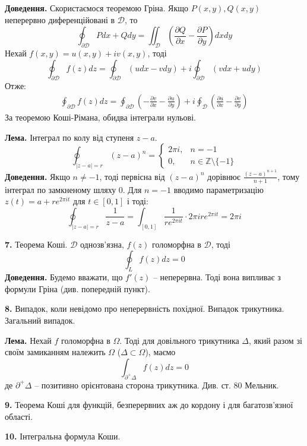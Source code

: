 \documentclass[14pt]{extarticle}
\begin{document}
\textbf{Доведення.} Скористаємося теоремою Гріна. Якщо $P(x,y),Q(x,y)$ неперервно диференційовані в $\mathcal{D}$, то
\[
\oint_{\partial\mathcal{D}}Pdx+Qdy = \iint_{\mathcal{D}}\left(\frac{\partial Q}{\partial x} - \frac{\partial P}{\partial y}\right)dxdy
\]
Нехай $f(x,y)=u(x,y)+iv(x,y)$, тоді
\[
\oint_{\partial\mathcal{D}}f(z)dz = \oint_{\partial\mathcal{D}}(udx-vdy) + i\oint_{\partial\mathcal{D}}(vdx+udy)
\]
Отже:
\begin{gather*}
\oint_{\partial\mathcal{D}}f(z)dz = \oint_{\partial\mathcal{D}}\left(-\frac{\partial v}{\partial x}-\frac{\partial u}{\partial y}\right) + i\oint_{\mathcal{D}}\left(\frac{\partial u}{\partial x} - \frac{\partial v}{\partial y}\right)
\end{gather*}
За теоремою Коші-Рімана, обидва інтеграли нульові.

\textbf{Лема.} Інтеграл по колу від ступеня $z-a$.
\[
\oint_{|z-a|=r}(z-a)^n = \begin{cases}
    2\pi i, & n = -1 \\
    0, & n \in \mathbb{Z} \setminus \{-1\}
\end{cases}
\]
\textbf{Доведення.} Якщо $n\neq -1$, тоді первісна від $(z-a)^n$ дорівнює $\frac{(z-a)^{n+1}}{n+1}$, тому інтеграл по замкненому шляху $0$. Для $n=-1$ вводимо параметризацію $z(t)=a+re^{2\pi i t}$ для $t \in [0,1]$ і тоді:
\[
\oint_{|z-a|=r} \frac{1}{z-a} = \int_{[0,1]}\frac{1}{re^{2\pi i t}} \cdot 2\pi i re^{2\pi i t} = 2\pi i
\]

\textbf{7.} Теорема Коші. $\mathcal{D}$ однозв'язна, $f(z)$ голоморфна в $\mathcal{D}$, тоді 
\[
\oint_{L}f(z)dz=0
\]
\textbf{Доведення.} Будемо вважати, що $f'(z)$ -- неперервна. Тоді вона випливає з формули Гріна (див. попередній пункт).

\textbf{8.} Випадок, коли невідомо про неперервність похідної. Випадок трикутника. Загальний випадок.

\textbf{Лема.} Нехай $f$ голоморфна в $\Omega$. Тоді для довільного трикутника $\Delta$, який разом зі своїм замиканням належить $\Omega$ ($\Delta \subset \Omega$), маємо
\[
\int_{\partial^+\Delta}f(z)dz =0 
\]
де $\partial^+\Delta$ -- позитивно орієнтована сторона трикутника. Див. ст. 80 Мельник.

\textbf{9.} Теорема Коші для функцій, безперервних аж до кордону і для багатозв’язної області.

\textbf{10.} Інтегральна формула Коши.
\end{document}
